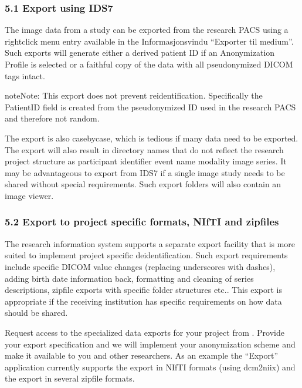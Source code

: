 \documentclass[letterpaper,10pt,english]{sphinxmanual}
\begin{document}
\subsubsection{5.1 Export using IDS7}
\label{\detokenize{EndUser/end-user:export-using-ids7}}
\sphinxAtStartPar
The image data from a study can be exported from the research PACS using a right\sphinxhyphen{}click menu entry available in the Informasjonsvindu “Exporter til medium”. Such exports will generate either a derived patient ID \textendash{} if an Anonymization Profile is selected or a faithful copy of the data with all pseudonymized DICOM tags intact.

\begin{sphinxadmonition}{note}{Note:}
\sphinxAtStartPar
This export does not prevent re\sphinxhyphen{}identification. Specifically the PatientID field is created from the pseudonymized ID used in the research PACS and therefore not random.
\end{sphinxadmonition}

\sphinxAtStartPar
The export is also case\sphinxhyphen{}by\sphinxhyphen{}case, which is tedious if many data need to be exported. The export will also result in directory names that do not reflect the research project structure as participant identifier \textendash{} event name \textendash{} modality \textendash{} image series. It may be advantageous to export from IDS7 if a single image study needs to be shared without special requirements. Such export folders will also contain an image viewer.


\subsubsection{5.2 Export to project specific formats, NIfTI and zip\sphinxhyphen{}files}
\label{\detokenize{EndUser/end-user:export-to-project-specific-formats-nifti-and-zip-files}}
\sphinxAtStartPar
The research information system supports a separate export facility that is more suited to implement project specific de\sphinxhyphen{}identification. Such export requirements include specific DICOM value changes (replacing underscores with dashes), adding birth date information back, formatting and cleaning of series descriptions, zip\sphinxhyphen{}file exports with specific folder structures etc.. This export is appropriate if the receiving institution has specific requirements on how data should be shared.

\sphinxAtStartPar
Request access to the specialized data exports for your project from . Provide your export specification and we will implement your anonymization scheme and make it available to you and other researchers. As an example the “Export” application currently supports the export in NIfTI formats (using dcm2niix) and the export in several zip\sphinxhyphen{}file formats.
\end{document}
